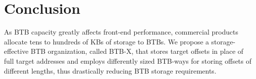 \section{Conclusion}
\label{sec:concl}

As BTB capacity greatly affects front-end performance, commercial products allocate tens to hundreds of KBs of storage to BTBs. We propose a storage-effective BTB organization, called BTB-X, that stores target offsets in place of full target addresses and employs differently sized BTB-ways for storing offsets of different lengths, thus drastically reducing BTB storage requirements.